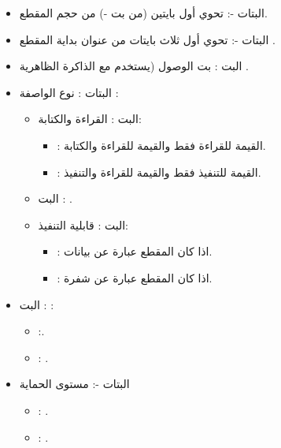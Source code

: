 \documentclass[document.tex]{subfiles}
\begin{document}
\begin{itemize}
\item البتات -: تحوي أول بايتين (من بت  -) من حجم المقطع.
\item البتات -: تحوي أول ثلاث بايتات من عنوان بداية المقطع .
\item البت : بت الوصول  (يستخدم مع الذاكرة الظاهرية .
\item البتات : نوع الواصفة :
\begin{itemize}
\item البت : القراءة والكتابة:
\begin{itemize}
\item {}: القيمة  للقراءة فقط والقيمة  للقراءة  والكتابة.
\item {}: القيمة  للتنفيذ فقط  والقيمة  للقراءة  والتنفيذ.
\end{itemize}

\item البت : .

\item البت : قابلية التنفيذ:
\begin{itemize}
\item {}: اذا كان المقطع عبارة عن بيانات.
\item {}: اذا كان المقطع عبارة عن شفرة.

\end{itemize}
\end{itemize}

\item البت : :
\begin{itemize}
\item {}:.
\item {}: .

\end{itemize}

\item البتات -: مستوى الحماية 
\begin{itemize}
\item {}: .
\item {}: .

\end{itemize}


\end{itemize}
\end{document}
